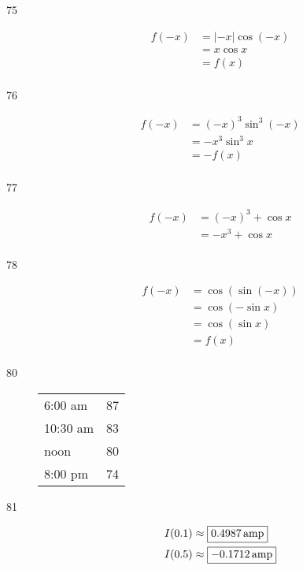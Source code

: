 \documentclass{exam}
\begin{document}
\begin{description}

      \item[75]
        \begin{align*}
          f(-x) & = | -x | \cos (-x) \\
                & = x \cos x \\
                & = f(x) \\
        \end{align*}

      \item[76]
        \begin{align*}
          f(-x) & = (-x)^3 \sin^3 (-x) \\
                & = - x^3 \sin^3 x \\
                & = - f(x) \\
        \end{align*}

      \item[77]
        \begin{align*}
          f(-x) & = (-x)^3 + \cos x \\
                & = - x^3 + \cos x \\
        \end{align*}

      \item[78]
        \begin{align*}
          f(-x) & = \cos (\sin (-x)) \\
                & = \cos (- \sin x) \\
                & = \cos (\sin x) \\
                & = f(x) \\
        \end{align*}

      \item[80]
        \begin{tabular}[H]{lr}
          \toprule
          6:00 am  & 87 \\
          10:30 am & 83 \\
          noon     & 80 \\
          8:00 pm  & 74 \\
          \bottomrule
        \end{tabular}

      \item[81]
        \begin{align*}
          I(0.1) & \approx \boxed{ \unit[0.4987]{amp} } \\
          I(0.5) & \approx \boxed{ \unit[-0.1712]{amp} } \\
        \end{align*}
    \end{description}
\end{document}
